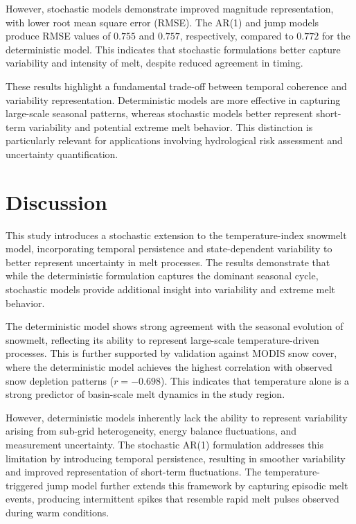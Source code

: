 \documentclass[11pt]{article}
\begin{document}
However, stochastic models demonstrate improved magnitude representation, with lower root mean square error (RMSE). The AR(1) and jump models produce RMSE values of $0.755$ and $0.757$, respectively, compared to $0.772$ for the deterministic model. This indicates that stochastic formulations better capture variability and intensity of melt, despite reduced agreement in timing.

These results highlight a fundamental trade-off between temporal coherence and variability representation. Deterministic models are more effective in capturing large-scale seasonal patterns, whereas stochastic models better represent short-term variability and potential extreme melt behavior. This distinction is particularly relevant for applications involving hydrological risk assessment and uncertainty quantification.


	\section{Discussion}
	
	This study introduces a stochastic extension to the temperature-index snowmelt model, incorporating temporal persistence and state-dependent variability to better represent uncertainty in melt processes. The results demonstrate that while the deterministic formulation captures the dominant seasonal cycle, stochastic models provide additional insight into variability and extreme melt behavior.
	
	The deterministic model shows strong agreement with the seasonal evolution of snowmelt, reflecting its ability to represent large-scale temperature-driven processes. This is further supported by validation against MODIS snow cover, where the deterministic model achieves the highest correlation with observed snow depletion patterns ($r = -0.698$). This indicates that temperature alone is a strong predictor of basin-scale melt dynamics in the study region.
	
	However, deterministic models inherently lack the ability to represent variability arising from sub-grid heterogeneity, energy balance fluctuations, and measurement uncertainty. The stochastic AR(1) formulation addresses this limitation by introducing temporal persistence, resulting in smoother variability and improved representation of short-term fluctuations. The temperature-triggered jump model further extends this framework by capturing episodic melt events, producing intermittent spikes that resemble rapid melt pulses observed during warm conditions.
	
\end{document}
